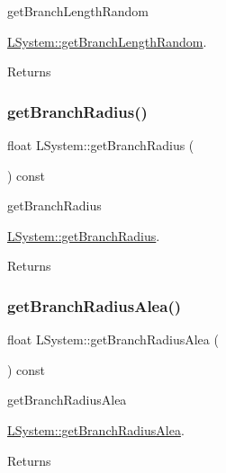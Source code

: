 get\+Branch\+Length\+Random 

\hyperlink{classLSystem_a826543c6871f8cc26b0be7ad7c4c3f22}{L\+System\+::get\+Branch\+Length\+Random}.

\begin{DoxyReturn}{Returns}

\end{DoxyReturn}
\mbox{\label{classLSystem_ae4392bb48f3e6cb1e75099cefbf9fa18}} 
\subsubsection{\texorpdfstring{get\+Branch\+Radius()}{getBranchRadius()}}
{\footnotesize\ttfamily float L\+System\+::get\+Branch\+Radius (\begin{DoxyParamCaption}{ }\end{DoxyParamCaption}) const}



get\+Branch\+Radius 

\hyperlink{classLSystem_ae4392bb48f3e6cb1e75099cefbf9fa18}{L\+System\+::get\+Branch\+Radius}.

\begin{DoxyReturn}{Returns}

\end{DoxyReturn}
\mbox{\label{classLSystem_ad76d3b4b6f1b5bdd089b885c4e286543}} 
\subsubsection{\texorpdfstring{get\+Branch\+Radius\+Alea()}{getBranchRadiusAlea()}}
{\footnotesize\ttfamily float L\+System\+::get\+Branch\+Radius\+Alea (\begin{DoxyParamCaption}{ }\end{DoxyParamCaption}) const}



get\+Branch\+Radius\+Alea 

\hyperlink{classLSystem_ad76d3b4b6f1b5bdd089b885c4e286543}{L\+System\+::get\+Branch\+Radius\+Alea}.

\begin{DoxyReturn}{Returns}

\end{DoxyReturn}
\mbox{\label{classLSystem_aceef49d8f1e28428711c43f7d0487fed}} 
